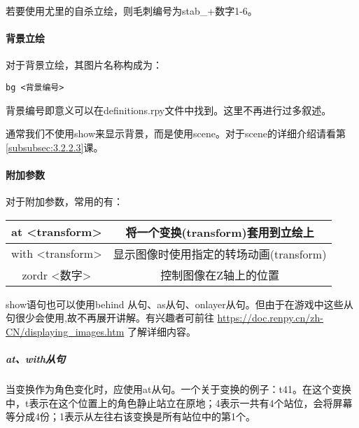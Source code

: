 若要使用尤里的自杀立绘，则毛刺编号为stab\_+数字1-6。

\paragraph{背景立绘}

对于背景立绘，其图片名称构成为：
\begin{lstlisting}
bg <背景编号>
\end{lstlisting}

背景编号即意义可以在definitions.rpy文件中找到。这里不再进行过多叙述。

\begin{ExtraKnowledge}
通常我们不使用show来显示背景，而是使用scene。对于scene的详细介绍请看第\ref{subsubsec:3.2.2.3}课。
\end{ExtraKnowledge}

\paragraph{附加参数}

对于附加参数，常用的有：
\begin{center}
    \tabletail{\hline}
    \tablelasttail{\hline}
    \begin{supertabular}{|c|c|}
        \hline
        at <transform> & 将一个变换(transform)套用到立绘上\\
        \hline
        with <transform> & 显示图像时使用指定的转场动画(transform)\\
        \hline
        zordr <数字> & 控制图像在Z轴上的位置\\
        \hline
    \end{supertabular}
\end{center}

\begin{ExtraKnowledge}
show语句也可以使用behind 从句、as从句、onlayer从句。但由于在游戏中这些从句很少会使用,故不再展开讲解。有兴趣者可前往 \url{https://doc.renpy.cn/zh-CN/displaying_images.htm} 了解详细内容。
\end{ExtraKnowledge}

\subparagraph{at、with从句}
\label{subsubsec:3.2.2.1}
当变换作为角色变化时，应使用at从句。一个关于变换的例子：t41。在这个变换中，t表示在这个位置上的角色静止站立在原地；4表示一共有4个站位，会将屏幕等分成4份；1表示从左往右该变换是所有站位中的第1个。

